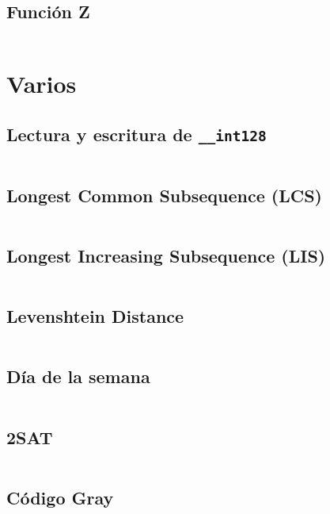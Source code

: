 \documentclass[11pt]{article}
\begin{document}
		\subsection{Función Z}
		\inputminted[tabsize=2,breaklines,firstline=241,lastline=253,fontsize=\small]{c++}{strings.cpp}
	
	\newpage
	\section{Varios}
		\subsection{Lectura y escritura de \texttt{\_\_int128}}
		\inputminted[tabsize=2,breaklines,firstline=46,lastline=83,fontsize=\small]{c++}{misc.cpp}
		
		\subsection{Longest Common Subsequence (LCS)}
		\inputminted[tabsize=2,breaklines,firstline=21,lastline=33,fontsize=\small]{c++}{misc.cpp}
		
		\subsection{Longest Increasing Subsequence (LIS)}
		\inputminted[tabsize=2,breaklines,firstline=5,lastline=19,fontsize=\small]{c++}{misc.cpp}
		
		\subsection{Levenshtein Distance}
		\inputminted[tabsize=2,breaklines,firstline=145,lastline=156,fontsize=\small]{c++}{misc.cpp}
		
		\subsection{Día de la semana}
		\inputminted[tabsize=2,breaklines,firstline=35,lastline=44,fontsize=\small]{c++}{misc.cpp}
		
		\subsection{2SAT}
		\inputminted[tabsize=2,breaklines,firstline=85,lastline=128,fontsize=\small]{c++}{misc.cpp}
		
		\subsection{Código Gray}
		\inputminted[tabsize=2,breaklines,firstline=130,lastline=143,fontsize=\small]{c++}{misc.cpp}
		
\end{document}
